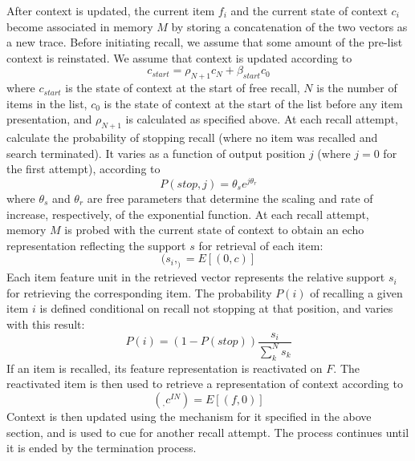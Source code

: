 {}After context is updated, the current item $f_i$ and the current state of context $c_i$ become associated in memory $M$ by storing a concatenation of the two vectors as a new trace.\markdownRendererInterblockSeparator
{}\markdownRendererInterblockSeparator
{}Before initiating recall, we assume that some amount of the pre-list context is reinstated. We assume that context is updated according to\markdownRendererInterblockSeparator
{}$$c_{start} = \rho_{N+1}c_N + \beta_{start}c_0$$\markdownRendererInterblockSeparator
{}where $c_{start}$ is the state of context at the start of free recall, $N$ is the number of items in the list, $c_0$ is the state of context at the start of the list before any item presentation, and $\rho_{N+1}$ is calculated as specified above.\markdownRendererInterblockSeparator
{}At each recall attempt, calculate the probability of stopping recall (where no item was recalled and search terminated). It varies as a function of output position $j$ (where $j=0$ for the first attempt), according to\markdownRendererInterblockSeparator
{}$$P(stop, j) = \theta_se^{j\theta_r}$$\markdownRendererInterblockSeparator
{}where $\theta_s$ and $\theta_r$ are free parameters that determine the scaling and rate of increase, respectively, of the exponential function.\markdownRendererInterblockSeparator
{}At each recall attempt, memory $M$ is probed with the current state of context to obtain an echo representation reflecting the support $s$ for retrieval of each item:\markdownRendererInterblockSeparator
{}$$(s_i , _) = E[(0, c)]$$\markdownRendererInterblockSeparator
{}Each item feature unit in the retrieved vector represents the relative support $s_i$ for retrieving the corresponding item. The probability $P(i)$ of recalling a given item $i$ is defined conditional on recall not stopping at that position, and varies with this result:\markdownRendererInterblockSeparator
{}$$P(i) = (1-P(stop))\frac{s_i}{\sum_{k}^{N}s_k}$$\markdownRendererInterblockSeparator
{}If an item is recalled, its feature representation is reactivated on $F$. The reactivated item is then used to retrieve a representation of context according to\markdownRendererInterblockSeparator
{}$$(_ , c^{IN}) = E\left[(f, 0)\right]$$\markdownRendererInterblockSeparator
{}Context is then updated using the mechanism for it specified in the above section, and is used to cue for another recall attempt. The process continues until it is ended by the termination process.\markdownRendererInterblockSeparator
{}\markdownRendererInterblockSeparator
